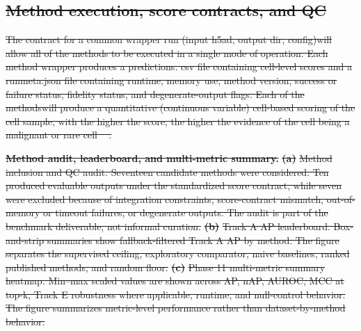 \documentclass[10pt]{article}
\providecommand{\DIFaddtex}[1]{{\protect\color{trackgreen}#1}} %
\providecommand{\DIFdeltex}[1]{{\protect\color{red}\sout{#1}}}                      %
\providecommand{\DIFdelbegin}{} %
\providecommand{\DIFaddFL}[1]{\DIFadd{#1}} %
\providecommand{\DIFdelFL}[1]{\DIFdel{#1}} %
\providecommand{\DIFaddbeginFL}{} %
\providecommand{\DIFaddendFL}{} %
\providecommand{\DIFdelendFL}{} %
\providecommand{\DIFadd}[1]{\texorpdfstring{\DIFaddtex{#1}}{#1}} %
\providecommand{\DIFdel}[1]{\texorpdfstring{\DIFdeltex{#1}}{}} %
\newcommand{\DIFscaledelfig}{0.5}
\newlength{\DIFdelgraphicswidth} %
\newlength{\DIFdelgraphicsheight} %
\newcommand{\DIFaddincludegraphics}[2][]{{\color{trackgreen}\fbox{\DIFOincludegraphics[#1]{#2}}}} %
\newcommand{\DIFdelincludegraphics}[2][]{%
\sbox{\DIFdelgraphicsbox}{\DIFOincludegraphics[#1]{#2}}%
\settoboxwidth{\DIFdelgraphicswidth}{\DIFdelgraphicsbox} %
\settoboxtotalheight{\DIFdelgraphicsheight}{\DIFdelgraphicsbox} %
\scalebox{\DIFscaledelfig}{%
\parbox[b]{\DIFdelgraphicswidth}{\usebox{\DIFdelgraphicsbox}\\[-\baselineskip] \rule{\DIFdelgraphicswidth}{0em}}\llap{\resizebox{\DIFdelgraphicswidth}{\DIFdelgraphicsheight}{%
\setlength{\unitlength}{\DIFdelgraphicswidth}%
\begin{picture}(1,1)%
\thicklines\linethickness{2pt} %
{\color[rgb]{1,0,0}\put(0,0){\framebox(1,1){}}}%
{\color[rgb]{1,0,0}\put(0,0){\line( 1,1){1}}}%
{\color[rgb]{1,0,0}\put(0,1){\line(1,-1){1}}}%
\end{picture}%
}\hspace*{3pt}}} %
} %
\DeclareRobustCommand{\DIFdelbegin}{\DIFOdelbegin \let\includegraphics\DIFdelincludegraphics} %
\DeclareRobustCommand{\DIFaddbeginFL}{\DIFOaddbeginFL \let\includegraphics\DIFaddincludegraphics} %
\DeclareRobustCommand{\DIFaddendFL}{\DIFOaddendFL \let\includegraphics\DIFOincludegraphics} %
\DeclareRobustCommand{\DIFdelendFL}{\DIFOaddendFL \let\includegraphics\DIFOincludegraphics} %
\begin{document}
\DIFdelbegin \subsection{\DIFdel{Method execution, score contracts, and QC}}
\addtocounter{subsection}{-1}%

\DIFdel{The contract for a common wrapper run (input h5ad, output dir, config)will allow all of the methods to be executed in a single mode of operation.
Each method wrapper produces a predictions. csv file containing cell-level scores and a runmeta.json file containing runtime, memory use, method version, success or failure status,
fidelity status, and degenerate-output flags. Each of the methodswill produce a quantitative (continuous variable) cell-based scoring of the cell sample, with the higher the score, the higher the evidence of the cell being a malignant or rare cell \mbox{%
\cite{martens2023rarity,xu2024sccad}}\hskip0pt%
.
}%

{%
\textbf{\DIFdelFL{Method audit, leaderboard, and multi-metric summary.}}%
\textbf{\DIFdelFL{(a)}} %
\DIFdelFL{Method inclusion and QC audit. Seventeen candidate methods were considered. Ten produced evaluable outputs under the standardized score contract, while seven were excluded because of integration constraints, score-contract mismatch, out-of-memory or timeout failures, or degenerate outputs. The audit is part of the benchmark deliverable, not informal curation. }\textbf{\DIFdelFL{(b)}} %
\DIFdelFL{Track A AP leaderboard. Box-and-strip summaries show fallback-filtered Track A AP by method. The figure separates the supervised ceiling, exploratory comparator, naive baselines, ranked published methods, and random floor. }\textbf{\DIFdelFL{(c)}} %
\DIFdelFL{Phase 11 multi-metric summary heatmap. Min--max scaled values are shown across AP, nAP, AUROC, MCC at top-k, Track E robustness where applicable, runtime, and null-control behavior. The figure summarizes metric-level performance rather than dataset-by-method behavior.}}
\DIFdelendFL \DIFaddbeginFL \begin{center}\DIFaddFL{\rule{0.5\linewidth}{0.5pt}}\end{center}
\DIFaddendFL 
\end{document}
